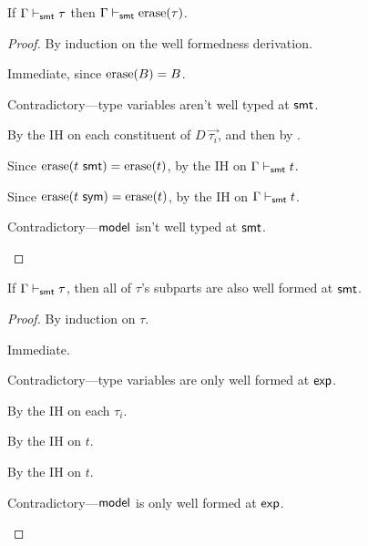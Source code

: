 \documentclass[acmsmall,screen,nonacm]{acmart}
\theoremstyle{definition}
\begin{document}
\begin{lemma}
\label{lem:erase-wf}
  If $\Gamma \vdash_{\mathsf{smt}} \tau$ then $\Gamma \vdash_{\mathsf{smt}} \mathrm{erase}(\tau)$.
%
\begin{proof}
  By induction on the well formedness derivation.
%
\begin{proofcases}

  \item[(\rn{$t$-Base})] Immediate, since $\mathrm{erase}(B) = B$.

  \item[(\rn{$t$-TVar})] Contradictory---type variables aren't well typed at $\mathsf{smt}$.

  \item[(\rn{$t$-ADT})] By the IH on each constituent of $D
  ~ \vec{\tau_i}$, and then by .

  \item[(\rn{$\tau$-SMT})] Since $\mathrm{erase}({t} ~ \mathsf{smt}) = \mathrm{erase}(t)$, by the
  IH on $\Gamma \vdash_{\mathsf{smt}} t$.

  \item[(\rn{$\tau$-Sym})] Since $\mathrm{erase}({t} ~ \mathsf{sym}) = \mathrm{erase}(t)$, by the
  IH on $\Gamma \vdash_{\mathsf{smt}} t$.
%

  \item[(\rn{$\tau$-Model})] Contradictory---$\mathsf{model}$ isn't well typed
    at $\mathsf{smt}$.
%
    \qedhere

\end{proofcases}
\end{proof}
\end{lemma}

\begin{lemma}
  \label{lem:smt-wf-inversion}
%  
  If $\Gamma \vdash_{\mathsf{smt}} \tau$, then all of $\tau$'s subparts are also well formed at $\mathsf{smt}$.
%
  \begin{proof}
    By induction on $\tau$.
%
    \begin{proofcases}
    \item[($\tau=B$)] Immediate.
      
    \item[($\tau=\alpha$)] Contradictory---type variables are only well formed at $\mathsf{exp}$.
      
    \item[($\tau=D ~ \vec{\tau_i}$)] By the IH on each $\tau_i$.
      
    \item[($\tau=\smt{t}$)] By the IH on $t$.
      
    \item[($\tau=\sym{t}$)] By the IH on $t$.
      
    \item[($\tau=\MODEL$)] Contradictory---$\mathsf{model}$ is only well formed at $\mathsf{exp}$.
%
    \qedhere
    \end{proofcases}
  \end{proof}
\end{lemma}
\end{document}
